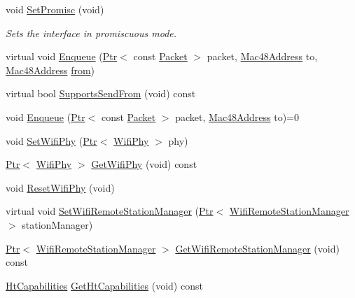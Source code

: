 \begin{DoxyCompactItemize}
\item 
void \hyperlink{classns3_1_1RegularWifiMac_a95bb0c4223d3242d196e5a118a22d011}{Set\+Promisc} (void)
\begin{DoxyCompactList}\small\item\em Sets the interface in promiscuous mode. \end{DoxyCompactList}\item 
virtual void \hyperlink{classns3_1_1RegularWifiMac_a2d4f98880477b25928a74cd9ab9df6e7}{Enqueue} (\hyperlink{classns3_1_1Ptr}{Ptr}$<$ const \hyperlink{classns3_1_1Packet}{Packet} $>$ packet, \hyperlink{classns3_1_1Mac48Address}{Mac48\+Address} to, \hyperlink{classns3_1_1Mac48Address}{Mac48\+Address} \hyperlink{lte__amc_8m_a1b4c81ff74eb1a626b5ade44c81004b3}{from})
\item 
virtual bool \hyperlink{classns3_1_1RegularWifiMac_a4042e0faa5c4e03ea75704c9a476c9ee}{Supports\+Send\+From} (void) const 
\item 
void \hyperlink{classns3_1_1RegularWifiMac_a646c2c6e87a90501f5688dfbde765bb7}{Enqueue} (\hyperlink{classns3_1_1Ptr}{Ptr}$<$ const \hyperlink{classns3_1_1Packet}{Packet} $>$ packet, \hyperlink{classns3_1_1Mac48Address}{Mac48\+Address} to)=0
\item 
void \hyperlink{classns3_1_1RegularWifiMac_a28e7c0a23027e1fc16f259e52b197ee9}{Set\+Wifi\+Phy} (\hyperlink{classns3_1_1Ptr}{Ptr}$<$ \hyperlink{classns3_1_1WifiPhy}{Wifi\+Phy} $>$ phy)
\item 
\hyperlink{classns3_1_1Ptr}{Ptr}$<$ \hyperlink{classns3_1_1WifiPhy}{Wifi\+Phy} $>$ \hyperlink{classns3_1_1RegularWifiMac_a81ec84683374ccb9de9c8124be1d6f3a}{Get\+Wifi\+Phy} (void) const 
\item 
void \hyperlink{classns3_1_1RegularWifiMac_a27dba298192a0dc28ce0eef7812c0b04}{Reset\+Wifi\+Phy} (void)
\item 
virtual void \hyperlink{classns3_1_1RegularWifiMac_a78959718cd1c3543063f991f9d5eb61b}{Set\+Wifi\+Remote\+Station\+Manager} (\hyperlink{classns3_1_1Ptr}{Ptr}$<$ \hyperlink{classns3_1_1WifiRemoteStationManager}{Wifi\+Remote\+Station\+Manager} $>$ station\+Manager)
\item 
\hyperlink{classns3_1_1Ptr}{Ptr}$<$ \hyperlink{classns3_1_1WifiRemoteStationManager}{Wifi\+Remote\+Station\+Manager} $>$ \hyperlink{classns3_1_1RegularWifiMac_a0f197c5277f1b3765038138f610f086a}{Get\+Wifi\+Remote\+Station\+Manager} (void) const 
\item 
\hyperlink{classns3_1_1HtCapabilities}{Ht\+Capabilities} \hyperlink{classns3_1_1RegularWifiMac_ae2b0a52735a938a0f1ca233397ae2185}{Get\+Ht\+Capabilities} (void) const 

\end{DoxyCompactItemize}
